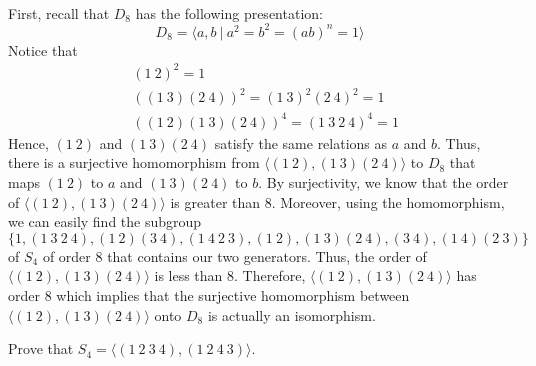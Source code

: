 \begin{solution}
    \\ First, recall that $D_8$ has the following presentation:
    $$D_8 = \langle a,b \ | \ a^2 = b^2 = (ab)^n = 1 \rangle$$
    Notice that
    \begin{align*}
        &(1 \ 2)^2 = 1 \\
        &((1 \ 3)(2 \ 4))^2 = (1 \ 3)^2(2 \ 4)^2 = 1 \\
        &((1 \ 2)(1 \ 3)(2 \ 4))^4 = (1 \ 3 \ 2 \ 4)^4 = 1
    \end{align*}
    Hence, $(1 \ 2)$ and $(1 \ 3)(2 \ 4)$ satisfy the same relations as $a$ and $b$. Thus, there is a surjective homomorphism from $\langle (1 \ 2), (1 \ 3)(2 \ 4) \rangle$ to $D_8$ that maps $(1 \ 2)$ to $a$ and $(1 \ 3)(2 \ 4)$ to $b$. By surjectivity, we know that the order of $\langle (1 \ 2), (1 \ 3)(2 \ 4) \rangle$ is greater than 8. Moreover, using the homomorphism, we can easily find the subgroup $\{1, (1 \ 3 \ 2 \ 4), (1 \ 2)(3 \ 4), (1 \ 4 \ 2 \ 3), (1 \ 2), (1 \ 3)(2 \ 4), (3 \ 4), (1 \ 4)(2 \ 3)\}$ of $S_4$ of order 8 that contains our two generators. Thus, the order of $\langle (1 \ 2), (1 \ 3)(2 \ 4) \rangle$ is less than 8. Therefore, $\langle (1 \ 2), (1 \ 3)(2 \ 4) \rangle$ has order 8 which implies that the surjective homomorphism between $\langle (1 \ 2), (1 \ 3)(2 \ 4) \rangle$ onto $D_8$ is actually an isomorphism.
    \\
\end{solution}

\begin{exercise}
    Prove that $S_4 = \langle (1 \ 2 \ 3 \ 4), (1 \ 2 \ 4 \ 3) \rangle$. \\
\end{exercise}

